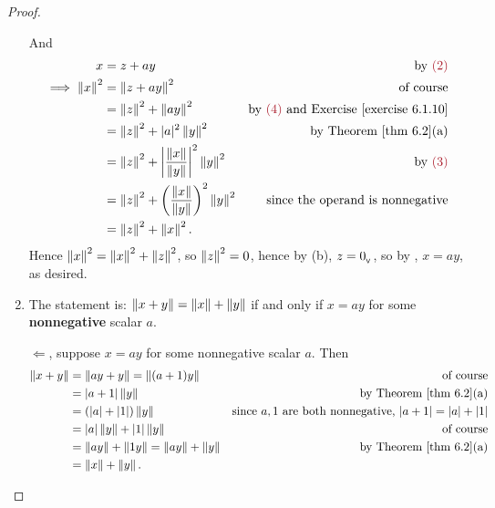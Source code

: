 \begin{proof}
\begin{enumerate}
And
\begin{align*}
    x & = z + ay & \text{by \MAROON{(2)}} \\
    \implies \norm{x}^2 & = \norm{z + ay}^2 & \text{of course} \\
        & = \norm{z}^2 + \norm{ay}^2& \text{by \MAROON{(4)} and \EXEC{6.1.10}} \\
        & = \norm{z}^2 + \abs{a}^2 \norm{y}^2 & \text{by \THM{6.2}(a)} \\
        & = \norm{z}^2 + \left| \frac{\norm{x}}{\norm{y}} \right|^2 \norm{y}^2 & \text{by \MAROON{(3)}} \\
        & = \norm{z}^2 + \left(\frac{\norm{x}}{\norm{y}}\right)^2 \norm{y}^2 & \text{since the operand is nonnegative} \\
        & = \norm{z}^2 + \norm{x}^2.
\end{align*}
Hence \(\left\lVert x\right\rVert^2 = \left\lVert x\right\rVert^2 + \left\lVert z\right\rVert^2\), so \(\left\lVert z\right\rVert^2 = 0\), hence by (b), \(z = 0_{_{\textsf{V}}}\), so by , \(x = ay\), as desired.

\item The statement is: \(\left\lVert x + y\right\rVert = \left\lVert x\right\rVert + \left\lVert y\right\rVert\) if and only if \(x = ay\) for some \textbf{nonnegative} scalar \(a\).

\(\Longleftarrow\), suppose \(x = ay\) for some nonnegative scalar \(a\).
Then
\begin{align*}
    \norm{x + y} & = \norm{ay + y} = \norm{(a + 1)y} & \text{of course} \\
        & = \abs{a + 1}\norm{y} & \text{by \THM{6.2}(a)} \\
        & = (\abs{a} + \abs{1})\norm{y} & \text{since \(a, 1\) are both nonnegative, \(\abs{a + 1} = \abs{a} + \abs{1}\)} \\
        & = \abs{a}\norm{y} + \abs{1}\norm{y} & \text{of course} \\
        & = \norm{ay} + \norm{1y} = \norm{ay} + \norm{y} & \text{by \THM{6.2}(a)} \\
        & = \norm{x} + \norm{y}.
\end{align*}


\end{enumerate}
\end{proof}

